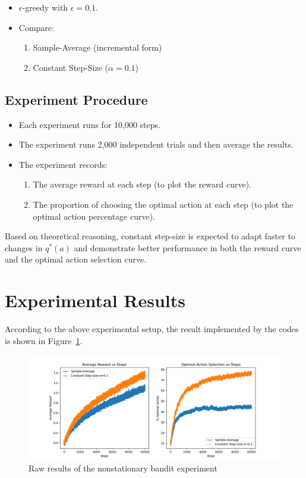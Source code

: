 \documentclass{article}
\begin{document}
\begin{itemize}
    \item \(\epsilon\)-greedy with \(\epsilon = 0.1\).
    \item Compare:
    \begin{enumerate}
        \item Sample-Average (incremental form)
        \item Constant Step-Size (\(\alpha=0.1\))
    \end{enumerate}
\end{itemize}

\subsection{Experiment Procedure}

\begin{itemize}
    \item Each experiment runs for 10{,}000 steps.
    \item The experiment runs 2{,}000 independent trials and then average the results.
    \item The experiment records:
    \begin{enumerate}
        \item The average reward at each step (to plot the reward curve).
        \item The proportion of choosing the optimal action at each step (to plot the optimal action percentage curve).
    \end{enumerate}
\end{itemize}

Based on theoretical reasoning, constant step-size is expected to adapt faster to changes in \(q^*(a)\) and demonstrate better performance in both the reward curve and the optimal action selection curve.

\section{Experimental Results}

According to the above experimental setup, the result implemented by the codes is shown in Figure~\ref{fig:3.1}.





\begin{figure}[h!]
\centering
\includegraphics[width=\linewidth]{figure2.png}
\caption{Raw results of the nonstationary bandit experiment}
\label{fig:3.1}
\end{figure}
\end{document}
